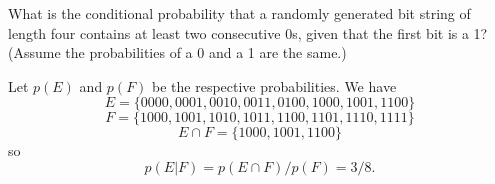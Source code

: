 \documentclass[../main.tex]{subfiles}
\begin{document}
What is the conditional probability that a randomly generated bit string of length four contains at least two consecutive 0s, given that the first bit is a 1?
(Assume the probabilities of a 0 and a 1 are the same.)

\solution
Let $p(E)$ and $p(F)$ be the respective probabilities.
We have
\[
	E = \{0000, 0001, 0010, 0011, 0100, 1000, 1001, 1100\}
\]
\[
	F = \{1000, 1001, 1010, 1011, 1100, 1101, 1110, 1111\}
\]
\[
	E \cap F = \{1000, 1001, 1100\}
\]
so
\[
p(E|F) = p(E \cap F)/p(F) = 3/8.
\]
\end{document}
